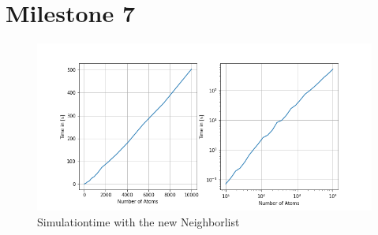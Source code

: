 \chapter{Milestone 7}

\begin{figure}[!h]
	\begin{center}
		\includegraphics[scale=1]{Figure/plotAtomTimesMoreData.png}
	\end{center}
	\caption[Simulationtime with the new Neighborlist]{Simulationtime with the new Neighborlist  }
	\label{PlotAtomTimesCutoffNew}
\end{figure}
